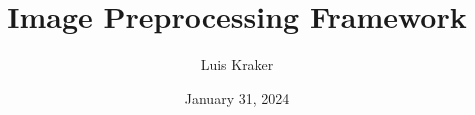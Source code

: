 \author{Luis Kraker}
\title[PCB Defect Detection]{Image Preprocessing Framework}
\date{January 31, 2024} 

                            